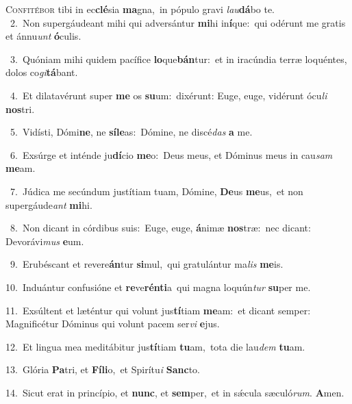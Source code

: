 \lettrine{\initial\textcolor{\initialcolor}{C}}{onfitébor} tibi in ec\-\textbf{clé}\-sia \textbf{ma}\-gna,~\star in pópulo gravi \textit{lau}\-\textbf{dá}bo te.\\
{\numbfont\textcolor{\numbcolor}{~2.}}~Non supergáudeant mihi qui adversántur \textbf{mi}\-hi in\-\textbf{í}\-que:~\star qui odérunt me gratis et ánnu\textit{unt} \textbf{ó}\-culis.\par
{\numbfont\textcolor{\numbcolor}{~3.}}~Quóniam mihi quidem pacífice \textbf{lo}\-que\-\textbf{bán}\-tur:~\star et in iracúndia terræ loquéntes, dolos co\-\textit{gi}\-\textbf{tá}bant.\par
{\numbfont\textcolor{\numbcolor}{~4.}}~Et dilatavérunt super \textbf{me} os \textbf{su}\-um:~\star dixérunt: Euge, euge, vidérunt ócu\textit{li} \textbf{nos}\-tri.\par
{\numbfont\textcolor{\numbcolor}{~5.}}~Vidísti, Dómi\-\textbf{ne}\-, ne \textbf{sí}\-\textbf{le}as:~\star Dómine, ne discé\textit{das} \textbf{a} me.\par
{\numbfont\textcolor{\numbcolor}{~6.}}~Exsúrge et inténde ju\-\textbf{dí}\-cio \textbf{me}\-o:~\star Deus meus, et Dóminus meus in cau\textit{sam} \textbf{me}\-am.\par
{\numbfont\textcolor{\numbcolor}{~7.}}~Júdica me secúndum justítiam tuam, Dómine, \textbf{De}\-us \textbf{me}\-us,~\star et non supergáude\textit{ant} \textbf{mi}\-hi.\par
{\numbfont\textcolor{\numbcolor}{~8.}}~Non dicant in córdibus suis:~\dagger Euge, euge, \textbf{á}\-nimæ \textbf{nos}\-træ:~\star nec dicant: Devorávi\textit{mus} \textbf{e}\-um.\par
{\numbfont\textcolor{\numbcolor}{~9.}}~Erubéscant et revere\-\textbf{án}\-tur \textbf{si}\-mul,~\star qui gratulántur ma\textit{lis} \textbf{me}\-is.\par
{\numbfont\textcolor{\numbcolor}{10.}}~Induántur confusióne et \textbf{re}\-ve\-\textbf{rén}\-\textbf{ti}a~\star qui magna loquún\textit{tur} \textbf{su}\-per me.\par
{\numbfont\textcolor{\numbcolor}{11.}}~Exsúltent et læténtur qui volunt jus\-\textbf{tí}\-tiam \textbf{me}\-am:~\star et dicant semper: Magnificétur Dóminus qui volunt pacem ser\textit{vi} \textbf{e}\-jus.\par
{\numbfont\textcolor{\numbcolor}{12.}}~Et lingua mea meditábitur jus\-\textbf{tí}\-tiam \textbf{tu}\-am,~\star tota die lau\textit{dem} \textbf{tu}\-am.\par
{\numbfont\textcolor{\numbcolor}{13.}}~Glória \textbf{Pa}\-tri, et \textbf{Fí}\-\textbf{li}o,~\star et Spirítu\textit{i} \textbf{Sanc}\-to.\par
{\numbfont\textcolor{\numbcolor}{14.}}~Sicut erat in princípio, et \textbf{nunc}\-, et \textbf{sem}\-per,~\star et in sǽcula sæculó\-\textit{rum}\-. \textbf{A}\-men.\par

